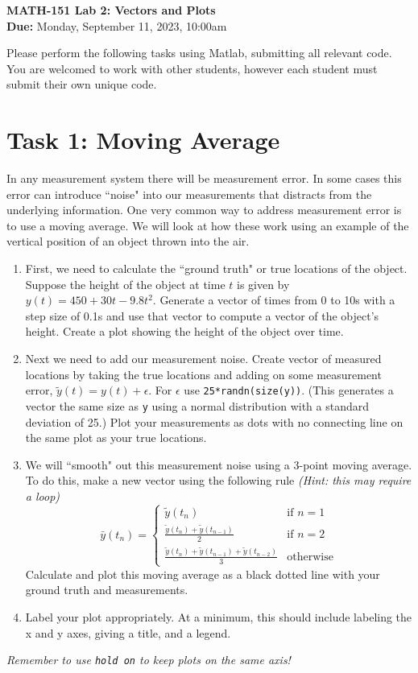 \documentclass[11pt]{article}
\begin{document}
	
	\begin{center}
		\Large{\textbf{MATH-151 Lab 2: Vectors and Plots}}\\
			\medskip
		\normalsize{\textbf{Due:} Monday, September 11, 2023, 10:00am} 
	\end{center}
	\noindent\makebox[\linewidth]{\rule{\textwidth}{0.4pt}}
	Please perform the following tasks using Matlab, submitting all relevant code. You are welcomed to work with other students, however each student must submit their own unique code.
	\section*{Task 1: Moving Average}
	\noindent In any measurement system there will be measurement error. In some cases this error can introduce ``noise" into our measurements that distracts from the underlying information. One very common way to address measurement error is to use a moving average. We will look at how these work using an example of the vertical position of an object thrown into the air.\\
	\begin{enumerate}[label=\alph*)]
		\item First, we need to calculate the ``ground truth" or true locations of the object. Suppose the height of the object at time $t$ is given by $y(t) = 450 + 30t - 9.8t^2$. Generate a vector of times from 0 to 10s with a step size of 0.1s and use that vector to compute a vector of the object's height. Create a plot showing the height of the object over time.
		\item Next we need to add our measurement noise. Create vector of measured locations by taking the true locations and adding on some measurement error, $\tilde{y}(t) = y(t) + \epsilon$. For $\epsilon$ use \texttt{25*randn(size(y))}. (This generates a vector the same size as \texttt{y} using a normal distribution with a standard deviation of 25.) Plot your measurements as dots with no connecting line on the same plot as your true locations.
		\item We will ``smooth" out this measurement noise using a 3-point moving average. To do this, make a new vector using the following rule \textit{(Hint: this may require a loop)}
		\begin{equation*}
			\bar{y}(t_n) =  \begin{cases}
				\tilde{y}(t_n) & \text{if } n=1 \\
				\frac{\tilde{y}(t_n) + \tilde{y}(t_{n-1})}{2} & \text{if } n=2 \\
				\frac{\tilde{y}(t_n) + \tilde{y}(t_{n-1}) +\tilde{y}(t_{n-2})}{3} & \text{otherwise}
			\end{cases}
		\end{equation*}
		Calculate and plot this moving average as a black dotted line with your ground truth and measurements.
		\item Label your plot appropriately. At a minimum, this should include labeling the x and y axes, giving a title, and a legend.
	\end{enumerate}

	\begin{center}
		\vfill
		\textit{Remember to use \texttt{hold on} to keep plots on the same axis!}
	\end{center}
\end{document}
